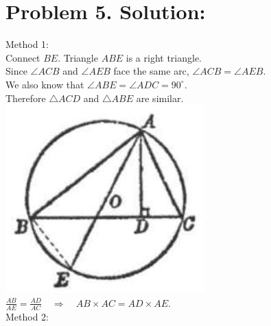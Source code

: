\documentclass[10pt]{article}
\begin{document}
\section*{Problem 5. Solution:}
Method 1:\\
Connect \(B E\). Triangle \(A B E\) is a right triangle.\\
Since \(\angle A C B\) and \(\angle A E B\) face the same arc, \(\angle A C B=\angle A E B\).\\
We also know that \(\angle A B E=\angle A D C=90^{\circ}\).\\
Therefore \(\triangle A C D\) and \(\triangle A B E\) are similar.\\
\includegraphics[max width=\textwidth, center]{2025_04_17_97bc1f7e44d93c271a88g-172(1)}\\
\(\frac{A B}{A E}=\frac{A D}{A C} \quad \Rightarrow \quad A B \times A C=A D \times A E\).\\
Method 2:
\end{document}

